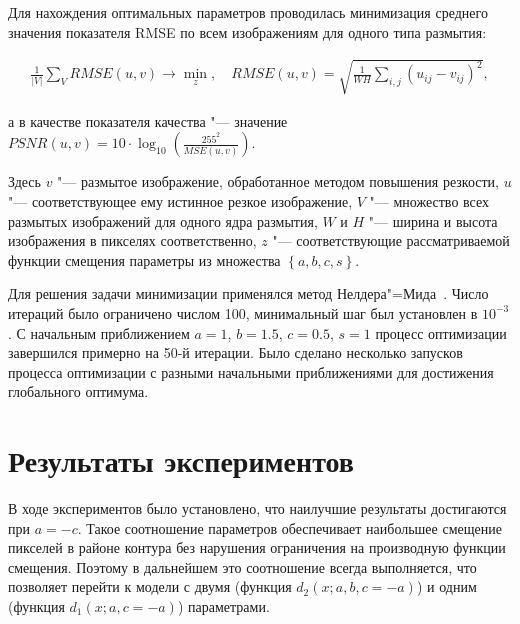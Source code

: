Для нахождения оптимальных параметров проводилась минимизация среднего значения показателя RMSE по всем изображениям для одного типа размытия:

\begin{align*}
	\frac{1}{\left|V\right|}\sum_{V}{RMSE\left(u,v\right) \rightarrow \min_{z}}, \quad
	RMSE\left(u,v\right)=\sqrt{\frac{1}{WH}\sum_{i,j}{(u_{ij}-v_{ij})}^2},
\end{align*}

%

\noindent а в качестве показателя качества "--- значение $PSNR\left(u,v\right) = 10 \cdot \log_{10}{\left(\frac{255^2}{MSE\left(u,v\right)}\right)}$.

Здесь $v$ "--- размытое изображение, обработанное методом повышения резкости, $u$ "--- соответствующее ему истинное резкое изображение, $V$ "--- множество всех размытых изображений для одного ядра размытия, $W$ и $H$ "--- ширина и высота изображения в пикселях соответственно, $z$ "--- соответствующие рассматриваемой функции смещения параметры из множества $\left\{a, b, c, s\right\}$.

Для решения задачи минимизации применялся метод Нелдера"=Мида~\cite{10.1093/comjnl/7.4.308}. Число итераций было ограничено числом 100, минимальный шаг был установлен в $10^{-3}$. С начальным приближением $a=1$, $b=1.5$, $c=0.5$, $s=1$ процесс оптимизации завершился примерно на 50-й итерации. Было сделано несколько запусков процесса оптимизации с разными начальными приближениями для достижения глобального оптимума.

\section{Результаты экспериментов}

В ходе экспериментов было установлено, что наилучшие результаты достигаются при $a=-c$. Такое соотношение параметров обеспечивает наибольшее смещение пикселей в районе контура без нарушения ограничения на производную функции смещения. Поэтому в дальнейшем это соотношение всегда выполняется, что позволяет перейти к модели с двумя (функция $d_2(x;a,b,c=-a)$) и одним (функция $d_1(x;a,c=-a)$) параметрами.

